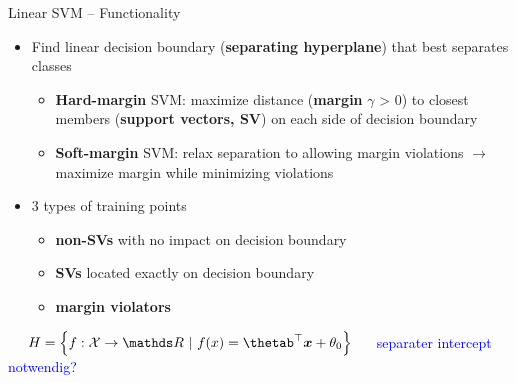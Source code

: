 \begin{vbframe}{Linear SVM -- Functionality}

   
\medskip


\begin{itemize}
  \item Find linear decision boundary (\textbf{separating hyperplane}) that 
  best separates classes
  \begin{itemize}
    \item \textbf{Hard-margin} SVM: maximize distance (\textbf{margin} 
    $\gamma$ > 0) to closest members (\textbf{support vectors, SV}) on each 
    side of decision boundary
    \item \textbf{Soft-margin} SVM: relax separation to allowing margin 
    violations $\rightarrow$ maximize margin while minimizing violations
  \end{itemize}
  \item 3 types of training points
  \begin{itemize}
    \item \textbf{non-SVs} with no impact on decision boundary
    \item \textbf{SVs} located exactly on decision boundary
    \item \textbf{margin violators}
  \end{itemize}
\end{itemize}

\medskip

 ~~
$\Hspace = \left\{f: \Xspace \to \R ~|~\fx = \thetab^\top \xv + \theta_0
\right\}$
 ~~ \textcolor{blue}{separater intercept notwendig?}

\framebreak


\end{vbframe}
